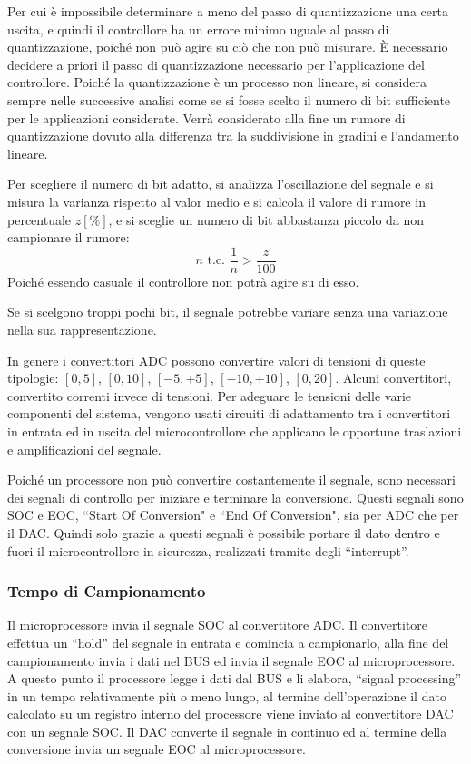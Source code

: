\documentclass{article}
\numberwithin{equation}{subsection}
\begin{document}
Per cui è impossibile determinare a meno del passo di quantizzazione una certa uscita, e quindi il controllore ha un errore minimo uguale al passo di quantizzazione, 
poiché non può agire su ciò che non può misurare. \`{E} necessario decidere a priori il passo di quantizzazione necessario per l'applicazione del controllore. 
Poiché la quantizzazione è un processo non lineare, si considera sempre nelle successive analisi come se si fosse scelto il numero di bit sufficiente per le applicazioni 
considerate. Verrà considerato alla fine un rumore di quantizzazione dovuto alla differenza tra la suddivisione in gradini e l'andamento lineare. 


Per scegliere il numero di bit adatto, si analizza l'oscillazione del segnale e si misura la varianza rispetto al valor medio e si calcola il valore di rumore in percentuale 
$z[\%]$, e si sceglie un numero di bit abbastanza piccolo da non campionare il rumore:
\begin{equation*}
    n\mbox{ t.c. }\displaystyle\frac{1}{n}>\frac{z}{100}
\end{equation*}
Poiché essendo casuale il controllore non potrà agire su di esso. 


Se si scelgono troppi pochi bit, il segnale potrebbe variare senza una variazione nella sua rappresentazione. 

In genere i convertitori ADC possono convertire valori di tensioni di queste tipologie: $[0,5]$, $[0,10]$, $[-5,+5]$, $[-10,+10]$, $[0,20]$. Alcuni convertitori, convertito 
correnti invece di tensioni. Per adeguare le tensioni delle varie componenti del sistema, vengono usati circuiti di adattamento tra i convertitori in entrata ed in uscita del 
microcontrollore che applicano le opportune traslazioni e amplificazioni del segnale. 



Poiché un processore non può convertire costantemente il segnale, sono necessari dei segnali di controllo per iniziare e terminare la conversione. Questi segnali sono SOC e 
EOC, ``Start Of Conversion" e ``End Of Conversion", sia per ADC che per il DAC. Quindi solo grazie a questi segnali è possibile portare il dato dentro e fuori il 
microcontrollore in sicurezza, realizzati tramite degli ``interrupt''.  

\subsubsection{Tempo di Campionamento}  

Il microprocessore invia il segnale SOC al convertitore ADC. Il convertitore effettua un ``hold'' del segnale in entrata e comincia a campionarlo, alla fine del campionamento  
invia i dati nel BUS ed invia il segnale EOC al microprocessore. A questo punto il processore legge i dati dal BUS e li elabora, ``signal processing'' in un tempo 
relativamente più o meno lungo, al termine dell'operazione il dato calcolato su un registro interno del processore viene inviato al convertitore DAC con un segnale SOC. Il DAC converte il 
segnale in continuo ed al termine della conversione invia un segnale EOC al microprocessore. 
\end{document}
